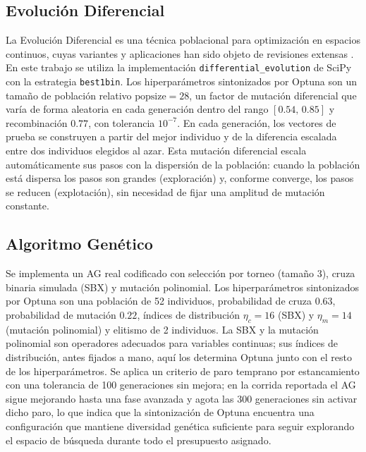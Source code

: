 \documentclass[conference]{IEEEtran}
\begin{document}
\subsection{Evolución Diferencial}
La Evolución Diferencial es una técnica poblacional para optimización en
espacios continuos, cuyas variantes y aplicaciones han sido objeto de revisiones
extensas \cite{ref_de_recent,ref_de_image}. En este trabajo se utiliza la
implementación \texttt{differential\_evolution} de SciPy con la
estrategia \texttt{best1bin}. Los hiperparámetros sintonizados por Optuna son
un tamaño de población relativo $\text{popsize}=28$, un factor de mutación
diferencial que varía de forma aleatoria en cada generación dentro del rango
$[0.54,\,0.85]$ y recombinación $0.77$, con tolerancia $10^{-7}$. En cada
generación, los vectores de prueba se construyen a partir del mejor individuo y
de la diferencia escalada entre dos individuos elegidos al azar. Esta mutación
diferencial escala automáticamente sus pasos con la dispersión de la población:
cuando la población está dispersa los pasos son grandes (exploración) y,
conforme converge, los pasos se reducen (explotación), sin necesidad de fijar
una amplitud de mutación constante.

\subsection{Algoritmo Genético}
Se implementa un AG real codificado con selección por torneo (tamaño 3), cruza
binaria simulada (SBX) \cite{ref_sbx} y mutación polinomial. Los hiperparámetros
sintonizados por Optuna son una población de 52 individuos, probabilidad de
cruza $0.63$, probabilidad de mutación $0.22$, índices de distribución
$\eta_c=16$ (SBX) y $\eta_m=14$ (mutación polinomial) y elitismo de 2 individuos.
La SBX y la mutación polinomial son operadores adecuados para variables
continuas; sus índices de distribución, antes fijados a mano, aquí los determina
Optuna junto con el resto de los hiperparámetros. Se aplica un criterio de paro
temprano por estancamiento con una tolerancia de 100 generaciones sin mejora; en
la corrida reportada el AG sigue mejorando hasta una fase avanzada y agota las
300 generaciones sin activar dicho paro, lo que indica que la sintonización de
Optuna encuentra una configuración que mantiene diversidad genética suficiente
para seguir explorando el espacio de búsqueda durante todo el presupuesto
asignado.
\end{document}
